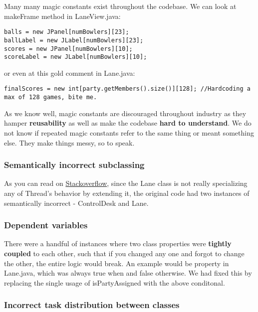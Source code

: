 Many many magic constants exist throughout the codebase. We can look at makeFrame method in LaneView.java:

\begin{verbatim}
balls = new JPanel[numBowlers][23];
ballLabel = new JLabel[numBowlers][23];
scores = new JPanel[numBowlers][10];
scoreLabel = new JLabel[numBowlers][10];
\end{verbatim}

or even at this gold comment in Lane.java:

\begin{verbatim}
finalScores = new int[party.getMembers().size()][128]; //Hardcoding a max of 128 games, bite me.
\end{verbatim}

As we know well, magic constants are discouraged throughout industry as they hamper \textbf{reusability} as well as make the codebase \textbf{hard to understand}. We do not know if repeated magic constants refer to the same thing or meant something else. They make things messy, so to speak.

\subsubsection{Semantically incorrect subclassing}

As you can read on \hyperlink{https://stackoverflow.com/questions/541487/implements-runnable-vs-extends-thread-in-java}{Stackoverflow}, since the Lane class is not really specializing any of Thread's behavior by extending it, the original code had two instances of semantically incorrect  - ControlDesk and Lane.

\subsubsection{Dependent variables}

There were a handful of instances where two class properties were \textbf{tightly coupled} to each other, such that if you changed any one and forgot to change the other, the entire logic would break. An example would be  property in Lane.java, which was always true when  and false otherwise. We had fixed this by replacing the single usage of isPartyAssigned with the above conditonal.

\subsubsection{Incorrect task distribution between classes}

